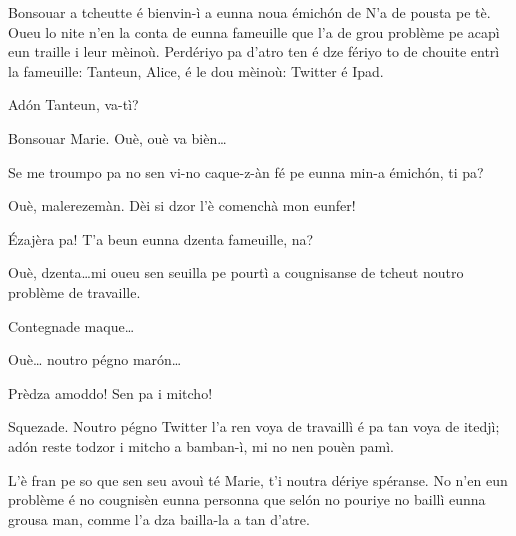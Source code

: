 \begin{drama}
\scene[-- N'a de pousta pe té]


\label{pousta}
 

\Mariespeaks Bonsouar a tcheutte é bienvin-ì a eunna noua émich\'on de \og N’a de pousta pe tè\fg. Oueu lo nite n'en la conta de eunna fameuille que l’a de grou problème pe acapì eun traille i leur mèinoù. Perdériyo pa d'atro ten é dze fériyo to de chouite entrì la fameuille: Tanteun, Alice,  é le dou mèinoù: Twitter é Ipad.


\Mariespeaks Ad\'on Tanteun, va-tì?

\Tanteunspeaks{} Bonsouar Marie. Ouè, ouè va bièn\ldots

\Mariespeaks Se me troumpo pa no sen vi-no caque-z-àn fé pe eunna min-a émich\'on, ti pa?

\Tanteunspeaks{} Ouè,  malerezemàn. Dèi si dzor l’è comenchà mon eunfer!

\Mariespeaks \'Ezajèra pa! T’a beun eunna dzenta fameuille, na?

\Tanteunspeaks Ouè, dzenta\ldots mi oueu sen seuilla pe pourtì a cougnisanse de tcheut noutro problème de travaille.

\Mariespeaks Contegnade maque\ldots

\Tanteunspeaks Ouè\ldots {} noutro pégno mar\'on\ldots


\Alicespeaks Prèdza amoddo! Sen pa i mitcho!

\Tanteunspeaks Squezade. Noutro pégno Twitter l’a ren voya de travaillì é pa tan voya de itedjì; ad\'on reste todzor i mitcho a bamban-ì, mi no nen pouèn pamì.

\Alicespeaks L’è fran pe so que sen seu avouì té Marie, t’i noutra dériye spéranse. No n'en eun problème é no cougnisèn eunna personna que sel\'on no pouriye no baillì eunna grousa man, comme  l’a dza bailla-la a tan d’atre.


\end{drama}
